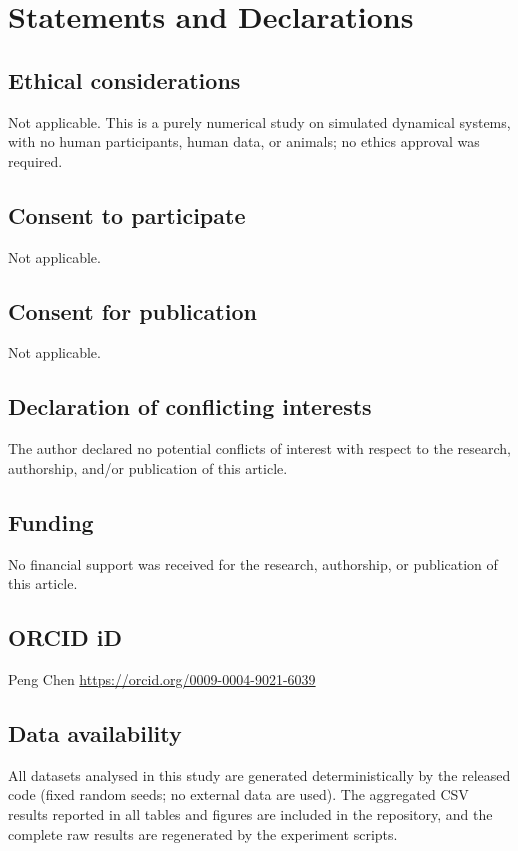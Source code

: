 \documentclass[11pt,sagev,times]{sagej}
\begin{document}
\section*{Statements and Declarations}

\subsection*{Ethical considerations}
Not applicable. This is a purely numerical study on simulated dynamical
systems, with no human participants, human data, or animals; no ethics
approval was required.

\subsection*{Consent to participate}
Not applicable.

\subsection*{Consent for publication}
Not applicable.

\subsection*{Declaration of conflicting interests}
The author declared no potential conflicts of interest with respect to the
research, authorship, and/or publication of this article.

\subsection*{Funding}
No financial support was received for the research, authorship, or
publication of this article.

\subsection*{ORCID iD}
Peng Chen \url{https://orcid.org/0009-0004-9021-6039}

\subsection*{Data availability}
All datasets analysed in this study are generated deterministically by the
released code (fixed random seeds; no external data are used). The aggregated
CSV results reported in all tables and figures are included in the repository,
and the complete raw results are regenerated by the experiment scripts.
\end{document}
